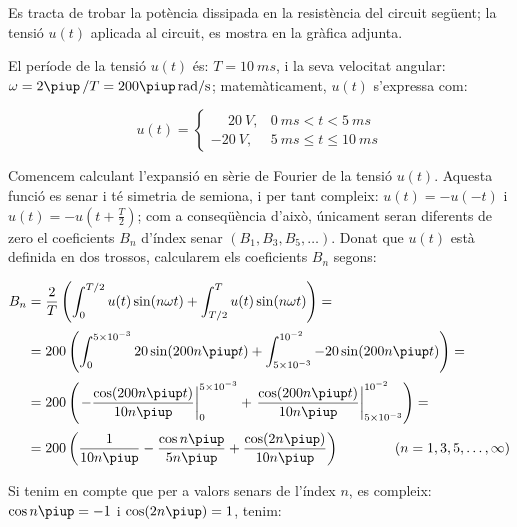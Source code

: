 \begin{exemple}\label{ex:fourier}
     Es tracta de trobar la potència
     dissipada en la resistència del circuit següent; la tensió $u(t)$ aplicada al circuit,
     es mostra en la gràfica adjunta.

    \begin{center}
        
    \end{center}

     El període de la tensió $u(t)$ és: $T=\SI{10}{ms}$, i la
    seva velocitat angular: $\omega = 2\piup\,/T = 200\piup\si{\,rad/s}$;
    matemàticament, $u(t)$ s'expressa com:

    \[
    u(t) = \begin{cases} \phantom{-}\SI{20}{V}, & \SI{0}{ms} < t < \SI{5}{ms} \\
           \SI{-20}{V}, & \SI{5}{ms} \leq t \leq \SI{10}{ms} \end{cases}
    \]

    Comencem calculant l'expansió en sèrie de Fourier de la tensió
    $u(t)$. Aquesta funció es senar i té simetria de semiona, i per tant
     compleix: $u(t)=-u(-t)$ i $u(t) = -u(t+\frac{T}{2})$; com a
    conseqüència d'això, únicament seran diferents de zero el
    coeficients $B_n$ d'índex senar $(B_1,B_3,B_5,\ldots)$. Donat que
    $u(t)$ està definida en dos trossos, calcularem els coeficients
    $B_n$ segons:

    \[
    \begin{split}
        B_n &= \frac{2}{T} \left( \int_0^{T/2} u(t) \sin(n \omega t) +
        \int_{T/2}^{T} u(t) \sin(n \omega t) \right) =\\[0.5ex]
        &= 200 \left( \int_0^{5\times 10^{-3}} 20 \sin(200 n \piup t) +
        \int_{5\times 10^{-3}}^{10^{-2}} -20 \sin(200 n \piup t) \right) =\\[0.5ex]
        &= 200 \left( \left. -\frac{\cos(200 n \piup t)}{10 n \piup}\right|_0^{5\times 10^{-3}}
        +  \left.\frac{\cos(200 n \piup t)}{10 n \piup}\right|_{5\times
        10^{-3}}^{10^{-2}}\right)=\\[0.5ex]
        &= 200\left( \frac{1}{10 n \piup} - \frac{\cos n \piup}{5 n \piup} +
        \frac{\cos (2 n \piup)}{10 n \piup}\right)
        \qquad\qquad(n=1,3,5,\ldots,\infty)
    \end{split}
    \]

    Si tenim en compte que per a valors senars de l'índex $n$, es
    compleix: $\cos n \piup = -1$ i $\cos (2 n \piup) = 1$, tenim:


\end{exemple}
